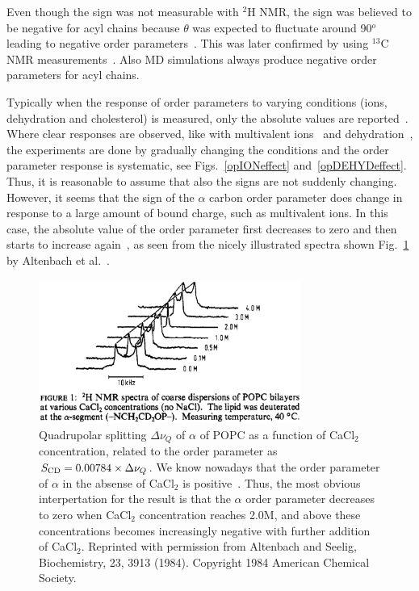 \documentclass[aps,prl,superscriptaddress,twocolumn]{revtex4}
\begin{document}
Even though the sign was not measurable with $^2$H NMR, the sign was believed to be negative for acyl chains because $\theta$ was expected to fluctuate 
around 90$^o$ leading to negative order parameters~\cite{seelig77c}. This was later confirmed by using $^{13}$C NMR measurements~\cite{hong95a}. 
Also MD simulations always produce negative order parameters for acyl chains.


Typically when the response of order parameters to varying conditions (ions, dehydration and cholesterol) is measured, only the absolute 
values are reported~\cite{akutsu81,altenbach84,bechinger91,ulrich94,dvinskikh05b,ferreira13}. Where clear responses are observed, 
like with multivalent ions~\cite{akutsu81,altenbach84} and dehydration~\cite{bechinger91,ulrich94,dvinskikh05b}, the experiments are done by gradually 
changing the conditions and the order parameter response is systematic, see Figs.~\ref{opIONeffect} and~\ref{opDEHYDeffect}. 
Thus, it is reasonable to assume that also the signs are not suddenly changing. However, it seems that the sign of 
the $\alpha$ carbon order parameter does change in response to a large amount of bound charge, such as multivalent ions. In this case, 
the absolute value of the order parameter first decreases to zero and then starts to increase again~\cite{altenbach84,seelig87}, 
as seen from the nicely illustrated spectra shown Fig.~\ref{qsCACLeffect} by Altenbach et al.~\cite{altenbach84}.
\begin{figure}[]
  \includegraphics[width=8.6cm]{../Fig/QUADsplitCACLeffect.eps}
\newline
  \caption{\label{qsCACLeffect}
    Quadrupolar splitting $\Delta \nu_Q$ of $\alpha$ of POPC as a function of CaCl$_2$ concentration, related to the order parameter as $S_{{\rm CD}}=0.00784 \times \Delta \nu_Q$. 
    We know nowadays that the order parameter of $\alpha$ in the absense of CaCl$_2$ is positive~\cite{hong95a,hong95b,gross97}.
    Thus, the most obvious interpertation for the result is that the $\alpha$ order parameter decreases to zero when CaCl$_2$ concentration reaches 2.0M, and 
    above these concentrations becomes increasingly negative with further addition of CaCl$_2$. Reprinted with permission from Altenbach and Seelig, Biochemistry, 23, 3913 (1984). Copyright 1984 American Chemical Society.    
  } 
\end{figure}
\end{document}
